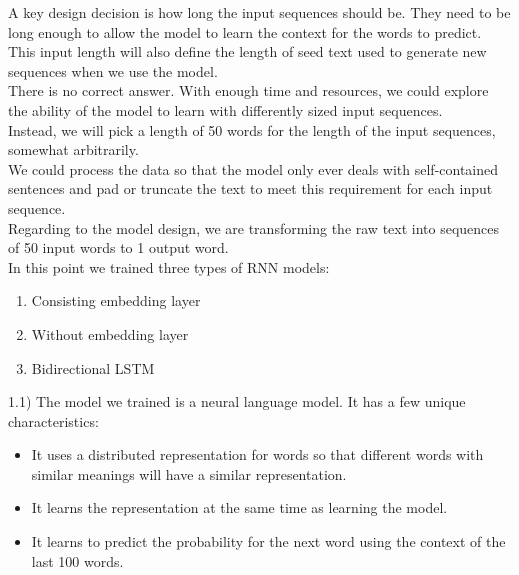 \documentclass[conference]{IEEEtran}
\begin{document}
A key design decision is how long the input sequences should be. They need to be long enough to allow the model to learn the context for the words to predict. This input length will also define the length of seed text used to generate new sequences when we use the model.\\
There is no correct answer. With enough time and resources, we could explore the ability of the model to learn with differently sized input sequences.\\
Instead, we will pick a length of 50 words for the length of the input sequences, somewhat arbitrarily.\\
We could process the data so that the model only ever deals with self-contained sentences and pad or truncate the text to meet this requirement for each input sequence.\\
Regarding to the model design, we are transforming the raw text into sequences of 50 input words to 1 output word.\\
In this point we trained three types of RNN models:
\begin{enumerate}
\item Consisting embedding layer
\item Without embedding layer
\item Bidirectional LSTM
\end{enumerate}

1.1) The model we trained is a neural language model. It has a few unique characteristics:

\begin{itemize}
\item It uses a distributed representation for words so that different words with similar meanings will have a similar representation.
\item It learns the representation at the same time as learning the model.
\item It learns to predict the probability for the next word using the context of the last 100 words.
\end{itemize}
\end{document}
